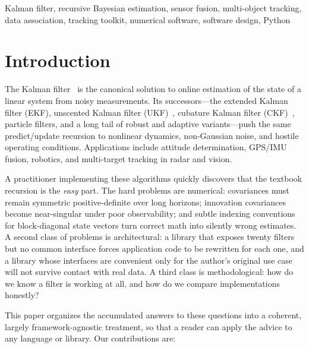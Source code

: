 \documentclass[10pt,conference]{IEEEtran}
\begin{document}
\begin{IEEEkeywords}
Kalman filter, recursive Bayesian estimation, sensor fusion, multi-object
tracking, data association, tracking toolkit, numerical software, software
design, Python
\end{IEEEkeywords}

\section{Introduction}

The Kalman filter~\cite{kalman1960} is the canonical solution to online
estimation of the state of a linear system from noisy measurements. Its
successors---the extended Kalman filter (EKF), unscented Kalman filter
(UKF)~\cite{julier2004unscented}, cubature Kalman filter
(CKF)~\cite{arasaratnam2009cubature}, particle filters, and a long tail of
robust and adaptive variants---push the same predict/update recursion to
nonlinear dynamics, non-Gaussian noise, and hostile operating conditions.
Applications include attitude determination, GPS/IMU fusion, robotics, and
multi-target tracking in radar and vision.

A practitioner implementing these algorithms quickly discovers that the
textbook recursion is the \emph{easy} part. The hard problems are numerical:
covariances must remain symmetric positive-definite over long horizons;
innovation covariances become near-singular under poor observability; and
subtle indexing conventions for block-diagonal state vectors turn correct
math into silently wrong estimates. A second class of problems is
architectural: a library that exposes twenty filters but no common interface
forces application code to be rewritten for each one, and a library whose
interfaces are convenient only for the author's original use case will not
survive contact with real data. A third class is methodological: how do we
know a filter is working at all, and how do we compare implementations
honestly?

This paper organizes the accumulated answers to these questions into a
coherent, largely framework-agnostic treatment, so that a reader can apply
the advice to any language or library. Our contributions are:
\end{document}
